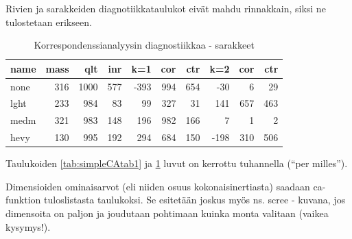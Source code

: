 \documentclass[
  finnish,
]{book}
\newenvironment{Shaded}{\begin{snugshade}}{\end{snugshade}}
\newcommand{\DataTypeTok}[1]{\textcolor[rgb]{0.13,0.29,0.53}{#1}}
\newcommand{\DecValTok}[1]{\textcolor[rgb]{0.00,0.00,0.81}{#1}}
\newcommand{\KeywordTok}[1]{\textcolor[rgb]{0.13,0.29,0.53}{\textbf{#1}}}
\newcommand{\NormalTok}[1]{#1}
\newcommand{\OperatorTok}[1]{\textcolor[rgb]{0.81,0.36,0.00}{\textbf{#1}}}
\newcommand{\OtherTok}[1]{\textcolor[rgb]{0.56,0.35,0.01}{#1}}
\newcommand{\StringTok}[1]{\textcolor[rgb]{0.31,0.60,0.02}{#1}}
\begin{document}
Rivien ja sarakkeiden diagnotiikkataulukot eivät mahdu rinnakkain, siksi ne tulostetaan erikseen.

\begin{Shaded}
\end{Shaded}

\begin{table}

\caption{\label{tab:simpleCAtab2}Korrespondenssianalyysin diagnostiikkaa - sarakkeet}
\centering
\begin{tabular}[t]{lrrrrrrrrr}
\toprule
name & mass &  qlt &  inr &  k=1 & cor & ctr &  k=2 & cor & ctr\\
\midrule
none & 316 & 1000 & 577 & -393 & 994 & 654 & -30 & 6 & 29\\
lght & 233 & 984 & 83 & 99 & 327 & 31 & 141 & 657 & 463\\
medm & 321 & 983 & 148 & 196 & 982 & 166 & 7 & 1 & 2\\
hevy & 130 & 995 & 192 & 294 & 684 & 150 & -198 & 310 & 506\\
\bottomrule
\end{tabular}
\end{table}

Taulukoiden \ref{tab:simpleCAtab1} ja \ref{tab:simpleCAtab2} luvut on kerrottu tuhannella (``per milles'').

Dimensioiden ominaisarvot (eli niiden osuus kokonaisinertiasta) saadaan ca-funktion tuloslistasta taulukoksi. Se esitetään joskus myös ns. scree - kuvana, jos dimensoita on paljon ja joudutaan pohtimaan kuinka monta valitaan (vaikea kysymys!).

\begin{Shaded}
\end{Shaded}
\end{document}
